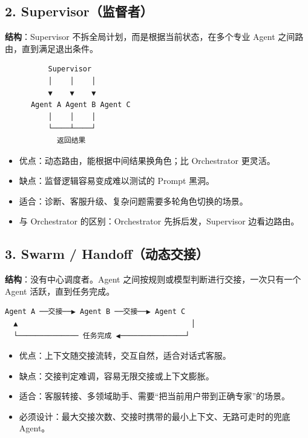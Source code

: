 \documentclass[9pt,a4paper,twocolumn]{ctexart}
\begin{document}
\subsection*{2. Supervisor（监督者）}


\textbf{结构}：Supervisor 不拆全局计划，而是根据当前状态，在多个专业 Agent 之间路由，直到满足退出条件。



\begin{lstlisting}
          Supervisor
          │    │    │
          ▼    ▼    ▼
      Agent A Agent B Agent C
          │    │    │
          └────┴────┘
            返回结果
\end{lstlisting}


\begin{itemize}[itemsep=1pt, topsep=2pt]
  \item 优点：动态路由，能根据中间结果换角色；比 Orchestrator 更灵活。
  \item 缺点：监督逻辑容易变成难以测试的 Prompt 黑洞。
  \item 适合：诊断、客服升级、复杂问题需要多轮角色切换的场景。
  \item 与 Orchestrator 的区别：Orchestrator 先拆后发，Supervisor 边看边路由。
\end{itemize}


\subsection*{3. Swarm / Handoff（动态交接）}


\textbf{结构}：没有中心调度者。Agent 之间按规则或模型判断进行交接，一次只有一个 Agent 活跃，直到任务完成。



\begin{lstlisting}
Agent A ──交接──▶ Agent B ──交接──▶ Agent C
  ▲                                        │
  └────────────── 任务完成 ◀───────────────┘
\end{lstlisting}


\begin{itemize}[itemsep=1pt, topsep=2pt]
  \item 优点：上下文随交接流转，交互自然，适合对话式客服。
  \item 缺点：交接判定难调，容易无限交接或上下文膨胀。
  \item 适合：客服转接、多领域助手、需要“把当前用户带到正确专家”的场景。
  \item 必须设计：最大交接次数、交接时携带的最小上下文、无路可走时的兜底 Agent。
\end{itemize}
\end{document}

